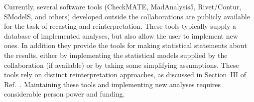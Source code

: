 \documentclass[11pt]{article}
\begin{document}







Currently, several software tools (CheckMATE, MadAnalysis5, Rivet/Contur, SModelS, and others) developed outside the collaborations are publicly available for the task of recasting and reinterpretation. These tools typically supply a database of implemented analyses, but also allow the user to implement new ones.
In addition they provide the tools for making statistical statements about the results, either by implementing the statistical models supplied by the collaboration (if available) or by taking some simplifying assumptions.
These tools rely on distinct reinterpretation approaches, as discussed in Section~III of Ref.~\cite{LHCReinterpretationForum:2020xtr}.
Maintaining these tools and implementing new analyses requires considerable person power and funding.
\end{document}
